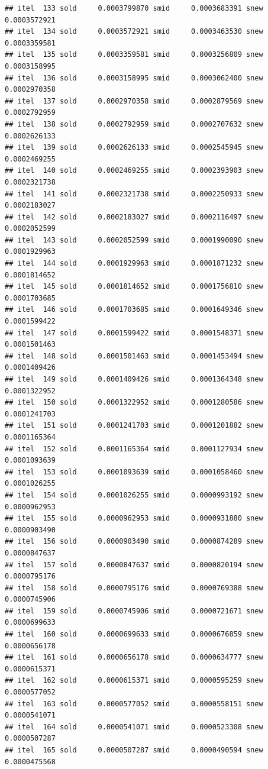 \documentclass[
  12pt,
]{article}
\begin{document}
\begin{verbatim}
## itel  133 sold     0.0003799870 smid     0.0003683391 snew     0.0003572921 
## itel  134 sold     0.0003572921 smid     0.0003463530 snew     0.0003359581 
## itel  135 sold     0.0003359581 smid     0.0003256809 snew     0.0003158995 
## itel  136 sold     0.0003158995 smid     0.0003062400 snew     0.0002970358 
## itel  137 sold     0.0002970358 smid     0.0002879569 snew     0.0002792959 
## itel  138 sold     0.0002792959 smid     0.0002707632 snew     0.0002626133 
## itel  139 sold     0.0002626133 smid     0.0002545945 snew     0.0002469255 
## itel  140 sold     0.0002469255 smid     0.0002393903 snew     0.0002321738 
## itel  141 sold     0.0002321738 smid     0.0002250933 snew     0.0002183027 
## itel  142 sold     0.0002183027 smid     0.0002116497 snew     0.0002052599 
## itel  143 sold     0.0002052599 smid     0.0001990090 snew     0.0001929963 
## itel  144 sold     0.0001929963 smid     0.0001871232 snew     0.0001814652 
## itel  145 sold     0.0001814652 smid     0.0001756810 snew     0.0001703685 
## itel  146 sold     0.0001703685 smid     0.0001649346 snew     0.0001599422 
## itel  147 sold     0.0001599422 smid     0.0001548371 snew     0.0001501463 
## itel  148 sold     0.0001501463 smid     0.0001453494 snew     0.0001409426 
## itel  149 sold     0.0001409426 smid     0.0001364348 snew     0.0001322952 
## itel  150 sold     0.0001322952 smid     0.0001280586 snew     0.0001241703 
## itel  151 sold     0.0001241703 smid     0.0001201882 snew     0.0001165364 
## itel  152 sold     0.0001165364 smid     0.0001127934 snew     0.0001093639 
## itel  153 sold     0.0001093639 smid     0.0001058460 snew     0.0001026255 
## itel  154 sold     0.0001026255 smid     0.0000993192 snew     0.0000962953 
## itel  155 sold     0.0000962953 smid     0.0000931880 snew     0.0000903490 
## itel  156 sold     0.0000903490 smid     0.0000874289 snew     0.0000847637 
## itel  157 sold     0.0000847637 smid     0.0000820194 snew     0.0000795176 
## itel  158 sold     0.0000795176 smid     0.0000769388 snew     0.0000745906 
## itel  159 sold     0.0000745906 smid     0.0000721671 snew     0.0000699633 
## itel  160 sold     0.0000699633 smid     0.0000676859 snew     0.0000656178 
## itel  161 sold     0.0000656178 smid     0.0000634777 snew     0.0000615371 
## itel  162 sold     0.0000615371 smid     0.0000595259 snew     0.0000577052 
## itel  163 sold     0.0000577052 smid     0.0000558151 snew     0.0000541071 
## itel  164 sold     0.0000541071 smid     0.0000523308 snew     0.0000507287 
## itel  165 sold     0.0000507287 smid     0.0000490594 snew     0.0000475568 

\end{verbatim}
\end{document}
